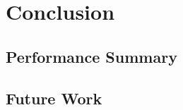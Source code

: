 \documentclass[12pt]{report}
\theoremstyle{remark}
\theoremstyle{definition}
\theoremstyle{definition}
\theoremstyle{definition}
\begin{document}
\chapter{Conclusion}
\section{Performance Summary}
\section{Future Work}

%
%
\end{document}
